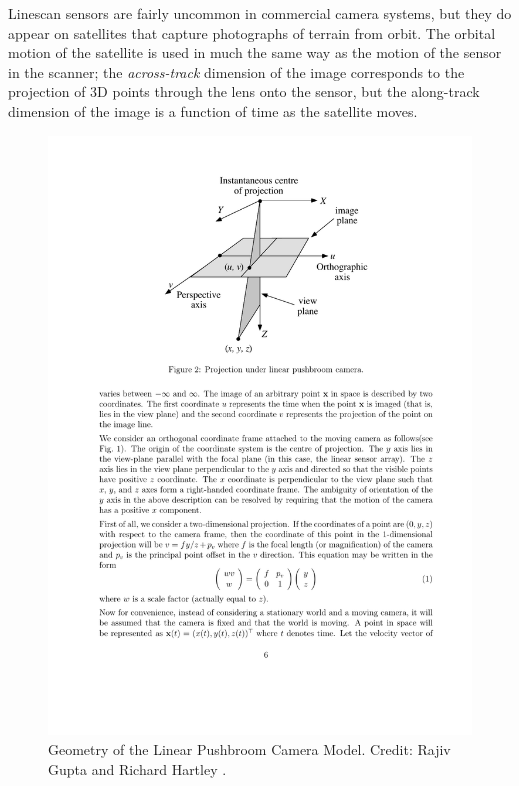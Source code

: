 Linescan sensors are fairly uncommon in commercial camera systems, but
they do appear on satellites that capture photographs of terrain from
orbit.  The orbital motion of the satellite is used in much the same
way as the motion of the sensor in the scanner; the {\em across-track}
dimension of the image corresponds to the projection of 3D points
through the lens onto the sensor, but the along-track dimension of the
image is a function of time as the satellite moves.  

\begin{figure}[tbp]
\begin{center}
  \includegraphics[width=5in]{images/pushbroom_geometry.pdf}
 \end{center}
  \label{fig:pinhole}
  \caption{Geometry of the Linear Pushbroom Camera Model.  Credit:
    Rajiv Gupta and Richard Hartley \cite{Gupta97}.}
\end{figure}


